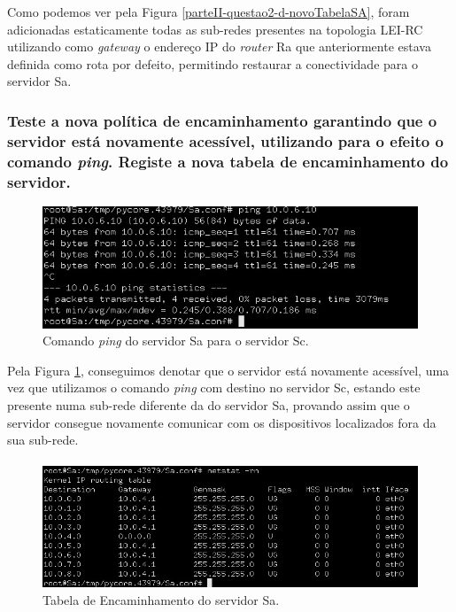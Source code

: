     
    \par Como podemos ver pela Figura \ref{parteII-questao2-d-novoTabelaSA}, foram adicionadas estaticamente todas as sub-redes presentes na topologia LEI-RC utilizando como \textit{gateway} o endereço IP do \textit{router} Ra que anteriormente estava definida como rota por defeito, permitindo restaurar a conectividade para o servidor Sa.
    
    
    
    
\paragraph{}
\subsubsection{Teste a nova política de encaminhamento garantindo que o servidor está novamente acessível, utilizando para o efeito o comando \textit{\textbf{ping}}. Registe a nova tabela de encaminhamento do servidor.}
  
    \begin{figure}[H]
    \centering
    \includegraphics[width=400pt]{images/ParteII/Questao2/parteII-questao2-e-SA-PING.jpg}
    \caption{Comando \textit{ping} do servidor Sa para o servidor Sc.} \label{parteII-questao2-e-PING}
    \end{figure} 
    
    
    \par Pela Figura \ref{parteII-questao2-e-PING}, conseguimos denotar que o servidor está novamente acessível, uma vez que utilizamos o comando \textit{ping} com destino no servidor Sc, estando este presente numa sub-rede diferente da do servidor Sa, provando assim que o servidor consegue novamente comunicar com os dispositivos localizados fora da sua sub-rede. 

    \paragraph{}
    \begin{figure}[H]
    \centering
    \includegraphics[width=400pt]{images/ParteII/Questao2/parteII-questao2-e-SA-TABELA.jpg}
    \caption{Tabela de Encaminhamento do servidor Sa.} \label{parteII-questao2-e-TABELA}
    \end{figure} 
  
